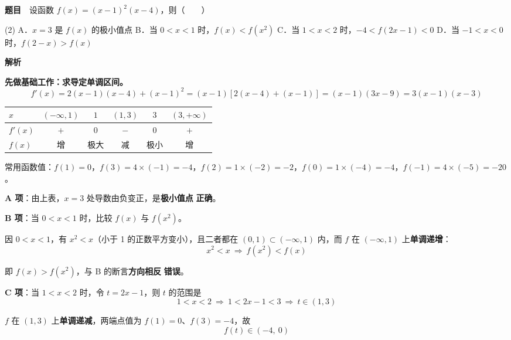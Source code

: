 \par\medskip


\textbf{题目}　设函数 $f(x)=(x-1)^{2}(x-4)$，则（　　）

\begin{gkopts}(2)
\task A．$x=3$ 是 $f(x)$ 的极小值点
\task B．当 $0<x<1$ 时，$f(x)<f\left(x^{2}\right)$
\task C．当 $1<x<2$ 时，$-4<f(2x-1)<0$
\task D．当 $-1<x<0$ 时，$f(2-x)>f(x)$
\end{gkopts}

\textbf{解析}

\textbf{先做基础工作：求导定单调区间。}
\[f'(x)=2(x-1)(x-4)+(x-1)^{2}=(x-1)\left[2(x-4)+(x-1)\right]=(x-1)(3x-9)=3(x-1)(x-3)\]

\begin{center}
\begin{tabular}{lccccc}
\toprule
$x$ & $(-\infty,1)$ & $1$ & $(1,3)$ & $3$ & $(3,+\infty)$ \\
\midrule
$f'(x)$ & $+$ & $0$ & $-$ & $0$ & $+$ \\
$f(x)$ & 增 & 极大 & 减 & 极小 & 增 \\
\bottomrule
\end{tabular}
\end{center}

常用函数值：$f(1)=0$，$f(3)=4\times(-1)=-4$，$f(2)=1\times(-2)=-2$，$f(0)=1\times(-4)=-4$，$f(-1)=4\times(-5)=-20$。

\par\medskip

\textbf{A 项}：由上表，$x=3$ 处导数由负变正，是\textbf{极小值点}  \textbf{正确}。

\par\medskip

\textbf{B 项}：当 $0<x<1$ 时，比较 $f(x)$ 与 $f\left(x^{2}\right)$。

因 $0<x<1$，有 $x^{2}<x$（小于 1 的正数平方变小），且二者都在 $(0,1)\subset(-\infty,1)$ 内，而 $f$ 在 $(-\infty,1)$ 上\textbf{单调递增}：
\[x^{2}<x\ \Longrightarrow\ f\left(x^{2}\right)<f(x)\]

即 $f(x)>f\left(x^{2}\right)$，与 B 的断言\textbf{方向相反}  \textbf{错误}。

\par\medskip

\textbf{C 项}：当 $1<x<2$ 时，令 $t=2x-1$，则 $t$ 的范围是
\[1<x<2\ \Longrightarrow\ 1<2x-1<3\ \Longrightarrow\ t\in(1,3)\]

$f$ 在 $(1,3)$ 上\textbf{单调递减}，两端点值为 $f(1)=0$、$f(3)=-4$，故
\[f(t)\in(-4,\ 0)\]

